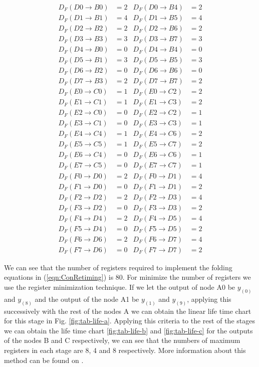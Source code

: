 \documentclass[journal,comsoc]{IEEEtran}
\begin{document}
\begin{small}
\begin{align}\label{eqn:ConRetiming} 
D_F(D0\to B0)&=2 &  D_F(D0\to B4)&=2 		 \\
D_F(D1\to B1)&=4 &  D_F(D1\to B5)&=4\nonumber\\
D_F(D2\to B2)&=2 &  D_F(D2\to B6)&=2\nonumber\\
D_F(D3\to B3)&=3 &  D_F(D3\to B7)&=3\nonumber\\
D_F(D4\to B0)&=0 &  D_F(D4\to B4)&=0\nonumber\\
D_F(D5\to B1)&=3 &  D_F(D5\to B5)&=3\nonumber\\
D_F(D6\to B2)&=0 &  D_F(D6\to B6)&=0\nonumber\\
D_F(D7\to B3)&=2 &  D_F(D7\to B7)&=2\nonumber\\
D_F(E0\to C0)&=1 &  D_F(E0\to C2)&=2\nonumber\\
D_F(E1\to C1)&=1 &  D_F(E1\to C3)&=2\nonumber\\
D_F(E2\to C0)&=0 &  D_F(E2\to C2)&=1\nonumber\\
D_F(E3\to C1)&=0 &  D_F(E3\to C3)&=1\nonumber\\
D_F(E4\to C4)&=1 &  D_F(E4\to C6)&=2\nonumber\\
D_F(E5\to C5)&=1 &  D_F(E5\to C7)&=2\nonumber\\
D_F(E6\to C4)&=0 &  D_F(E6\to C6)&=1\nonumber\\
D_F(E7\to C5)&=0 &  D_F(E7\to C7)&=1\nonumber\\
D_F(F0\to D0)&=2 &  D_F(F0\to D1)&=4\nonumber\\
D_F(F1\to D0)&=0 &  D_F(F1\to D1)&=2\nonumber\\
D_F(F2\to D2)&=2 &  D_F(F2\to D3)&=4\nonumber\\
D_F(F3\to D2)&=0 &  D_F(F3\to D3)&=2\nonumber\\
D_F(F4\to D4)&=2 &  D_F(F4\to D5)&=4\nonumber\\
D_F(F5\to D4)&=0 &  D_F(F5\to D5)&=2\nonumber\\
D_F(F6\to D6)&=2 &  D_F(F6\to D7)&=4\nonumber\\
D_F(F7\to D6)&=0 &  D_F(F7\to D7)&=2\nonumber
\end{align}
\end{small}
We can see that the number of registers required to implement the folding equations in (\ref{eqn:ConRetiming}) is 80. For minimize the number of registers we use the register minimization technique. 
If we let the output of node A0 be $y_{(0)}$ and $y_{(8)}$ and the output of the node A1 be $y_{(1)}$ and $y_{(9)}$, applying this successively with the rest of the nodes A we can obtain the linear life time chart for this stage in Fig. \ref{fig:tab-life-a}. Applying this criteria to the rest of the stages we can obtain the life time chart \ref{fig:tab-life-b} and \ref{fig:tab-life-c} for the outputs of the nodes B and C respectively, we can see that the numbers of maximum registers in each stage are 8, 4 and 8 respectively. More information about this method can be found on \cite{folding_parhi_book}.
\end{document}
